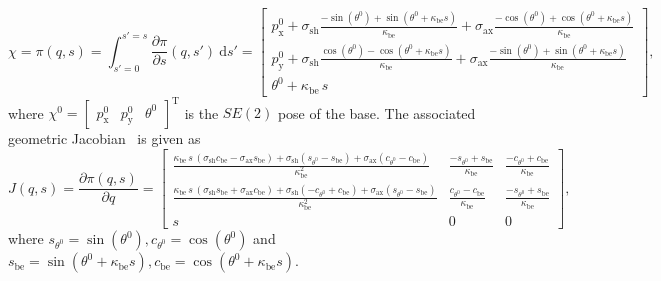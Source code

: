 \begin{equation}\label{eq:background:kinematics:planar_constant_strain:forward_kinematics}
    \chi = \pi(q,s) = \int_{s'=0}^{s'=s} \frac{\partial \pi}{\partial s}(q,s') \: \mathrm{d}s' = \begin{bmatrix}
        p_\mathrm{x}^0 + \sigma_\mathrm{sh} \frac{-\sin(\theta^0) + \sin(\theta^0 + \kappa_\mathrm{be} s)}{\kappa_\mathrm{be}} + \sigma_\mathrm{ax} \frac{-\cos(\theta^0) + \cos(\theta^0 + \kappa_\mathrm{be} s)}{\kappa_\mathrm{be}}\\
        p_\mathrm{y}^0 + \sigma_\mathrm{sh} \frac{\cos(\theta^0) - \cos(\theta^0 + \kappa_\mathrm{be} s)}{\kappa_\mathrm{be}} + \sigma_\mathrm{ax} \frac{-\sin(\theta^0)+\sin(\theta^0 + \kappa_\mathrm{be} s)}{\kappa_\mathrm{be}}\\
        \theta^0 + \kappa_\mathrm{be} \, s
    \end{bmatrix},
\end{equation}
where $\chi^0 = \begin{bmatrix}
    p_\mathrm{x}^0 & p_\mathrm{y}^0 & \theta^0
\end{bmatrix}^\mathrm{T}$ is the $SE(2)$ pose of the base.
The associated geometric Jacobian~\citep{siciliano2010robotics} is given as
\begin{equation}
    J(q,s) = \frac{\partial \pi(q,s)}{\partial q} = \begin{bmatrix}
        \frac{\kappa_\mathrm{be} \, s \, \left ( \sigma_\mathrm{sh} c_\mathrm{be} - \sigma_\mathrm{ax} s_\mathrm{be} \right ) + \sigma_\mathrm{sh} \left ( s_{\theta^0} - s_\mathrm{be} \right ) + \sigma_\mathrm{ax} \left ( c_{\theta^0} - c_\mathrm{be} \right )}{\kappa_\mathrm{be}^2}
        & \frac{-s_{\theta^0} + s_\mathrm{be}}{\kappa_\mathrm{be}}
        & \frac{-c_{\theta^0} + c_\mathrm{be}}{\kappa_\mathrm{be}}
        \\
        \frac{\kappa_\mathrm{be} \, s \, \left ( \sigma_\mathrm{sh} s_\mathrm{be} + \sigma_\mathrm{ax} c_\mathrm{be} \right ) + \sigma_\mathrm{sh} \left ( -c_{\theta^0} + c_\mathrm{be} \right ) + \sigma_\mathrm{ax} \left ( s_{\theta^0} - s_\mathrm{be} \right )}{\kappa_\mathrm{be}^2}
        & \frac{c_{\theta^0} - c_\mathrm{be}}{\kappa_\mathrm{be}}
        & \frac{-s_{\theta^0} + s_\mathrm{be}}{\kappa_\mathrm{be}}
        \\
        s & 0 & 0
    \end{bmatrix},
\end{equation}
where $s_{\theta^0} = \sin(\theta^0), c_{\theta^0} = \cos(\theta^0)$ and $s_\mathrm{be} = \sin(\theta^0+\kappa_\mathrm{be} s), c_\mathrm{be} = \cos(\theta^0+\kappa_\mathrm{be} s)$.
